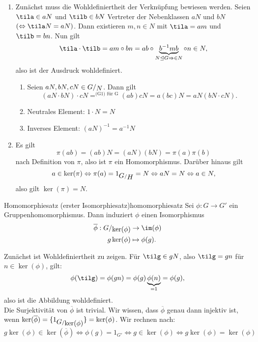 \begin{beweis}
\begin{enumerate}
\item Zunächst muss die Wohldefiniertheit der Verknüpfung bewiesen werden. Seien $\tila \in aN$ und $\tilb \in bN$ Vertreter der Nebenklassen $aN$ und $bN$ $(\iff \tila N = aN)$. Dann existieren $m,n \in N$ mit $\tila = am$ und $\tilb = bn$. Nun gilt
\begin{equation}
\tila \cdot \tilb = am \circ bn = ab \circ \underbrace{b^{-1} mb}_{N \trianglelefteq G \implies \in N} \circ n \in N,
\end{equation}
also ist der Ausdruck wohldefiniert.
\begin{enumerate}[({G}1)]
\item Seien $aN, bN, cN \in \quotient{G}{N}$. Dann gilt
\begin{equation}
(aN \cdot bN) \cdot cN =^{\text{(G1) für G}} (ab)cN = a(bc)N = aN(bN \cdot cN).
\end{equation}
\item Neutrales Element: $1 \cdot N = N$
\item Inverses Element: $(aN)^{-1} = a^{-1} N$
\end{enumerate}
\item Es gilt 
\begin{equation}
\pi (ab)  = (ab)N = (aN)(bN)=\pi(a)\pi(b)
\end{equation}
nach Definition von $\pi$, also ist $\pi$ ein Homomorphismus. Darüber hinaus gilt
\begin{equation}
a \in \ker (\pi) \iff \pi(a) = 1_{\quotient{G}{H}} = N \iff aN = N \iff a \in N,
\end{equation}
also gilt $\ker (\pi) = N$.
\end{enumerate}
\end{beweis}
\begin{satz}{Homomorphiesatz (erster Isomorphiesatz)}{homomorphiesatz}
Sei $\phi: G \to G'$ ein Gruppenhomomorphismus. Dann induziert $\phi$ einen Isomorphismus
\begin{align}
\overline{\phi} : \quotient{G}{\ker (\phi)} &\to \im (\phi)\\
g \ker (\phi) &\mapsto \phi(g).
\end{align}
\end{satz}
\begin{beweis}
Zunächst ist Wohldefiniertheit zu zeigen. Für $\tilg \in gN$, also $\tilg = gn$ für $n \in \ker (\phi)$, gilt:
\begin{equation}
\phi( \tilg) = \phi(gn) = \phi(g)\underbrace{\phi(n)}_{=1} = \phi(g),
\end{equation}
also ist die Abbildung wohldefiniert.\\
Die Surjektivität von $\overline{\phi}$ ist trivial. Wir wissen, dass $\overline{\phi}$ genau dann injektiv ist, wenn $\ker (\overline{\phi}) = \{1_{\quotient{G}{\ker (\phi) }}\} = \ker (\phi)$. Wir rechnen nach:
\begin{equation}
g \ker (\phi) \in \ker (\overline{\phi}) \iff \phi(g) = 1_{G'} \iff g \in \ker (\phi) \iff g \ker (\phi) = \ker (\phi)
\end{equation}
\end{beweis}
